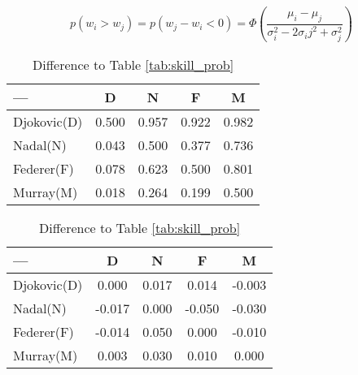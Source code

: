 \documentclass[11pt]{amsart}
\begin{document}
\begin{equation}
    p(w_i > w_j) = p(w_j-w_i < 0) =\Phi\left(\frac{ \mu_i - \mu_j }{\sigma_i^2 - 2\sigma_ij^{2}+\sigma_j^2}\right) \label{eqn:td_skills}
\end{equation}


\begin{table}
    \centering{}
    \begin{minipage}[t]{0.495\textwidth}
        \begin{center}
            \begin{tabular}{lcccc}\toprule
                ---         & D     & N     & F     & M     \\ \midrule
                Djokovic(D) & 0.500 & 0.957 & 0.922 & 0.982 \\
                Nadal(N)    & 0.043 & 0.500 & 0.377 & 0.736 \\
                Federer(F)  & 0.078 & 0.623 & 0.500 & 0.801 \\
                Murray(M)   & 0.018 & 0.264 & 0.199 & 0.500 \\\bottomrule
            \end{tabular}%
            \par\end{center}
        \caption{Skill Probabilities}    \label{tab:taskd_skill}
    \end{minipage}%
    \begin{minipage}[t]{0.495\textwidth}%
        \begin{center}
            \begin{tabular}{lcccc} \toprule
                ---         & D      & N     & F      & M      \\ \midrule
                Djokovic(D) & 0.000  & 0.017 & 0.014  & -0.003 \\
                Nadal(N)    & -0.017 & 0.000 & -0.050 & -0.030 \\
                Federer(F)  & -0.014 & 0.050 & 0.000  & -0.010 \\
                Murray(M)   & 0.003  & 0.030 & 0.010  & 0.000  \\ \bottomrule
            \end{tabular}
            \par\end{center}
        \caption{Difference to Table \ref{tab:skill_prob}} \label{tab:taskd_diff}
    \end{minipage}%
\end{table}
\end{document}
